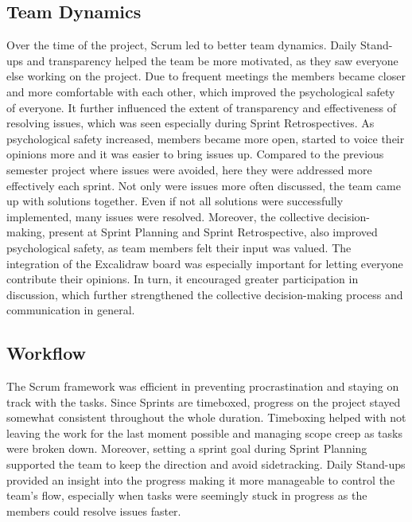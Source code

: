 \subsection*{Team Dynamics}
Over the time of the project, Scrum led to better team dynamics. Daily Stand-ups and transparency helped the team be more motivated, as they saw everyone else working on the project. Due to frequent meetings the members became closer and more comfortable with each other, which improved the psychological safety of everyone. It further influenced the extent of transparency and effectiveness of resolving issues, which was seen especially during Sprint Retrospectives. As psychological safety increased, members became more open, started to voice their opinions more and it was easier to bring issues up. Compared to the previous semester project where issues were avoided, here they were addressed more effectively each sprint. Not only were issues more often discussed, the team came up with solutions together. Even if not all solutions were successfully implemented, many issues were resolved. Moreover, the collective decision-making, present at Sprint Planning and Sprint Retrospective, also improved psychological safety, as team members felt their input was valued. The integration of the Excalidraw board was especially important for letting everyone contribute their opinions. In turn, it encouraged greater participation in discussion, which further strengthened the collective decision-making process and communication in general. 

\subsection*{Workflow}
The Scrum framework was efficient in preventing procrastination and staying on track with the tasks. Since Sprints are timeboxed, progress on the project stayed somewhat consistent throughout the whole duration. Timeboxing helped with not leaving the work for the last moment possible and managing scope creep as tasks were broken down. Moreover, setting a sprint goal during Sprint Planning supported the team to keep the direction and avoid sidetracking. Daily Stand-ups provided an insight into the progress making it more manageable to control the team's flow, especially when tasks were seemingly stuck in progress as the members could resolve issues faster.

